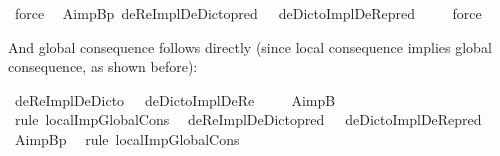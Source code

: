 \begin{isabellebody}
%
\isatagproof
{}\isamarkupfalse%
\ force\ %
%
\endisatagproof
{\isafoldproof}%
%
\isadelimproof
\isanewline
%
\endisadelimproof
{}\isamarkupfalse%
\ AimpB{\isacharunderscore}p{\isacharcolon}\ {\isachardoublequoteopen}{\isasymlfloor}deReImplDeDicto{\isacharunderscore}pred\ {\isacharparenleft}{\isasymtau}{\isacharcolon}{\isacharcolon}{\isasymup}{\isasymlangle}{\isasymzero}{\isasymrangle}{\isacharparenright}\ \isactrlbold {\isasymrightarrow}\ deDictoImplDeRe{\isacharunderscore}pred\ {\isasymtau}{\isasymrfloor}{\isachardoublequoteclose}\isanewline
%
\isadelimproof
\ \ %
\endisadelimproof
%
\isatagproof
{}\isamarkupfalse%
\ force\ %
%
\endisatagproof
{\isafoldproof}%
%
\isadelimproof
%
\endisadelimproof
%
\begin{isamarkuptext}%
And global consequence follows directly (since local consequence implies global consequence, as shown before):%
\end{isamarkuptext}\isamarkuptrue%
\isamarkupfalse%
\ {\isachardoublequoteopen}{\isasymlfloor}deReImplDeDicto\ {\isacharparenleft}{\isasymtau}{\isacharcolon}{\isacharcolon}{\isasymup}{\isasymzero}{\isacharparenright}{\isasymrfloor}\ {\isasymlongrightarrow}\ {\isasymlfloor}deDictoImplDeRe\ {\isasymtau}{\isasymrfloor}{\isachardoublequoteclose}\isanewline
%
\isadelimproof
\ \ %
\endisadelimproof
%
\isatagproof
{}\isamarkupfalse%
\ AimpB\ \isamarkupfalse%
\ {\isacharparenleft}rule\ localImpGlobalCons{\isacharparenright}\ %
%
\endisatagproof
{\isafoldproof}%
%
\isadelimproof
\isanewline
%
\endisadelimproof
{}\isamarkupfalse%
\ {\isachardoublequoteopen}{\isasymlfloor}deReImplDeDicto{\isacharunderscore}pred\ {\isacharparenleft}{\isasymtau}{\isacharcolon}{\isacharcolon}{\isasymup}{\isasymlangle}{\isasymzero}{\isasymrangle}{\isacharparenright}{\isasymrfloor}\ {\isasymlongrightarrow}\ {\isasymlfloor}deDictoImplDeRe{\isacharunderscore}pred\ {\isasymtau}{\isasymrfloor}{\isachardoublequoteclose}\isanewline
%
\isadelimproof
\ \ %
\endisadelimproof
%
\isatagproof
{}\isamarkupfalse%
\ AimpB{\isacharunderscore}p\ \isamarkupfalse%
\ {\isacharparenleft}rule\ localImpGlobalCons{\isacharparenright}\ %
%
\endisatagproof
{\isafoldproof}%
%
\isadelimproof
%
\endisadelimproof
%
\isamarkuptrue%
%
\begin{isamarkuptext}%

\end{isamarkuptext}
\end{isabellebody}
